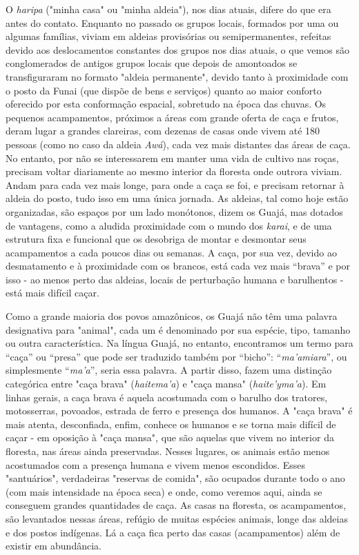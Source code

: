 O \emph{haripa} ("minha casa" ou "minha aldeia"), nos dias atuais,
difere do que era antes do contato. Enquanto no passado os grupos
locais, formados por uma ou algumas famílias, viviam em aldeias
provisórias ou semipermanentes, refeitas devido aos deslocamentos
constantes dos grupos nos dias atuais, o que vemos são conglomerados de
antigos grupos locais que depois de amontoados se transfiguraram no
formato "aldeia permanente", devido tanto à proximidade com o posto da
Funai (que dispõe de bens e serviços) quanto ao maior conforto oferecido
por esta conformação espacial, sobretudo na época das chuvas. Os
pequenos acampamentos, próximos a áreas com grande oferta de caça e
frutos, deram lugar a grandes clareiras, com dezenas de casas onde vivem
até 180 pessoas (como no caso da aldeia \emph{Awá}), cada vez mais
distantes das áreas de caça. No entanto, por não se interessarem em
manter uma vida de cultivo nas roças, precisam voltar diariamente ao
mesmo interior da floresta onde outrora viviam. Andam para cada vez mais
longe, para onde a caça se foi, e precisam retornar à aldeia do posto,
tudo isso em uma única jornada. As aldeias, tal como hoje estão
organizadas, são espaços por um lado monótonos, dizem os Guajá, mas
dotados de vantagens, como a aludida proximidade com o mundo dos
\emph{karai}, e de uma estrutura fixa e funcional que os desobriga de
montar e desmontar seus acampamentos a cada poucos dias ou semanas. A
caça, por sua vez, devido ao desmatamento e à proximidade com os
brancos, está cada vez mais ``brava'' e por isso - ao menos perto das
aldeias, locais de perturbação humana e barulhentos - está mais difícil
caçar.

Como a grande maioria dos povos amazônicos, os Guajá não têm uma palavra
designativa para "animal", cada um é denominado por sua espécie, tipo,
tamanho ou outra característica. Na língua Guajá, no entanto,
encontramos um termo para ``caça'' ou ``presa'' que pode ser traduzido
também por ``bicho'': ``\emph{ma'amiara}'', ou simplesmente
``\emph{ma'a}'', seria essa palavra. A partir disso, fazem uma distinção
categórica entre "caça brava" (\emph{haitema'a}) e "caça mansa"
(\emph{haite'yma'a}). Em linhas gerais, a caça brava é aquela acostumada
com o barulho dos tratores, motosserras, povoados, estrada de ferro e
presença dos humanos. A "caça brava" é mais atenta, desconfiada, enfim,
conhece os humanos e se torna mais difícil de caçar - em oposição à
"caça mansa", que são aquelas que vivem no interior da floresta, nas
áreas ainda preservadas. Nesses lugares, os animais estão menos
acostumados com a presença humana e vivem menos escondidos. Esses
"santuários", verdadeiras "reservas de comida", são ocupados durante
todo o ano (com mais intensidade na época seca) e onde, como veremos
aqui, ainda se conseguem grandes quantidades de caça. As casas na
floresta, os acampamentos, são levantados nessas áreas, refúgio de
muitas espécies animais, longe das aldeias e dos postos indígenas. Lá a
caça fica perto das casas (acampamentos) além de existir em abundância.

